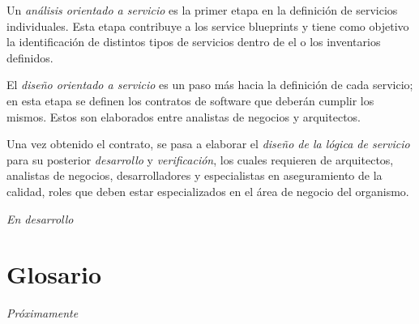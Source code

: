 \documentclass[11pt]{article}
\begin{document}
		Un \emph{análisis orientado a servicio} es la primer etapa en la definición de servicios individuales. Esta etapa contribuye a los service blueprints y tiene como objetivo la identificación de distintos tipos de servicios dentro de el o los inventarios definidos.

		El \emph{diseño orientado a servicio} es un paso más hacia la definición de cada servicio; en esta etapa se definen los contratos de software que deberán cumplir los mismos. Estos son elaborados entre analistas de negocios y arquitectos.

		Una vez obtenido el contrato, se pasa a elaborar el \emph{diseño de la lógica de servicio} para su posterior \emph{desarrollo} y \emph{verificación}, los cuales requieren de arquitectos, analistas de negocios, desarrolladores y especialistas en aseguramiento de la calidad, roles que deben estar especializados en el área de negocio del organismo.

		\emph{En desarrollo}

	\section{Glosario}
		\emph{Próximamente}

	
	
\end{document}
